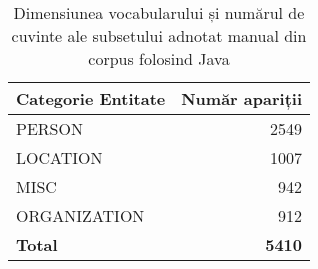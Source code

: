 \begin{center}
\begin{table}[htb]
  \caption{Dimensiunea vocabularului și numărul de cuvinte ale subsetului adnotat manual din corpus folosind Java}
  \begin{tabular}{|l|r|}
  \hline
   Categorie Entitate & Număr apariții\\
   \hline
  PERSON	&	2549	\\
  LOCATION	&	1007	\\
  MISC	&	942	\\
  ORGANIZATION	&	912	\\
   \hline
   \textbf{Total} 	&	\textbf{5410} \\
   \hline
   
  \end{tabular}
  \label{table:vocabulary-size-java-annotated}
\end{table}
\end{center}










